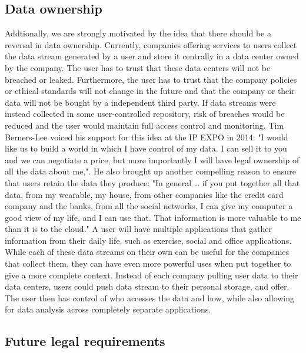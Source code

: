 \subsection{Data ownership}
\label{sec:motivation_data_ownership}

Addtionally, we are strongly motivated by the idea that there should be a reversal in data ownership. Currently, companies offering services to users collect the data stream generated by a user and store it centrally in a data center owned by the company. The user has to trust that these data centers will not be breached or leaked. Furthermore, the user has to trust that the company policies or ethical standards will not change in the future and that the company or their data will not be bought by a independent third party. If data streams were instead collected in some user-controlled repository, risk of breaches would be reduced and the user would maintain full access control and monitoring. Tim Berners-Lee voiced his support for this idea at the IP EXPO in 2014\citep{bernerslee2014dataownershiptelegraph}: "I would like us to build a world in which I have control of my data. I can sell it to you and we can negotiate a price, but more importantly I will have legal ownership of all the data about me,". He also brought up another compelling reason to ensure that users retain the data they produce\citep{bernerslee2014dataownershipguardian}: "In general … if you put together all that data, from my wearable, my house, from other companies like the credit card company and the banks, from all the social networks, I can give my computer a good view of my life, and I can use that. That information is more valuable to me than it is to the cloud." A user will have multiple applications that gather information from their daily life, such as exercise, social and office applications. While each of these data streams on their own can be useful for the companies that collect them, they can have even more powerful uses when put together to give a more complete context. Instead of each company pulling user data to their data centers, users could push data stream to their personal storage, and offer. The user then has control of who accesses the data and how, while also allowing for data analysis across completely separate applications.

\subsection{Future legal requirements}

